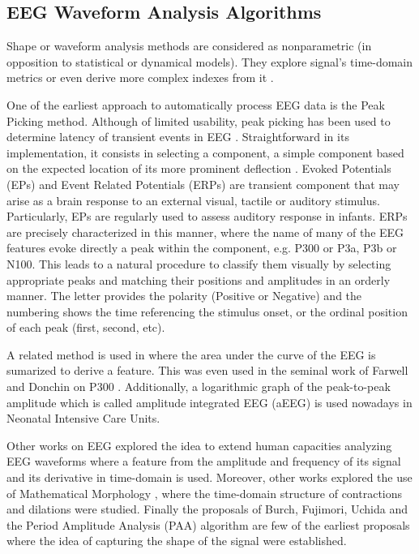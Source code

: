 
\subsection{EEG Waveform Analysis Algorithms}
\label{waveformalgorithms}

Shape or waveform analysis methods are considered as nonparametric (in opposition to statistical or dynamical models).  They explore signal's time-domain metrics or even derive more complex indexes from it \cite{Thakor2009}. 

One of the earliest approach to automatically process EEG data is the Peak Picking method.  Although of limited usability, peak picking has been used to determine latency of transient events in EEG \cite{Jaskowski2000,Zhang2011}.  Straightforward in its implementation, it consists in selecting a component, a simple component based on the expected location of its more prominent deflection \cite{Ouyang2017}.  Evoked Potentials (EPs) and Event Related Potentials (ERPs) are transient component that may arise as a brain response to an external visual, tactile or auditory stimulus.  Particularly, EPs are regularly used to assess auditory response in infants. ERPs are precisely characterized in this manner, where the name of many of the EEG features evoke directly a peak within the component, e.g. P300 or P3a, P3b or N100.  This leads to a natural procedure to classify them visually by selecting appropriate peaks and matching their positions and amplitudes in an orderly manner.  The letter provides the polarity (Positive or Negative) and the numbering shows the time referencing the stimulus onset, or the ordinal position of each peak (first, second, etc).   

A related method is used in \cite{Alvarado-Gonzalez2016} where the area under the curve of the EEG is sumarized to derive a feature.  This was even used in the seminal work of Farwell and Donchin on P300 \cite{Farwell1988,WolpawJonathanR2012}. Additionally, a logarithmic graph of the peak-to-peak amplitude which is called amplitude integrated EEG (aEEG) \cite{Shah2015} is used nowadays in Neonatal Intensive Care Units.

Other works on EEG explored the idea to extend human capacities analyzing EEG waveforms \cite{Klein1976} where a feature from the amplitude and frequency of its signal and its derivative in time-domain is used.  Moreover, other works explored the use of Mathematical Morphology \cite{Yamaguchi2009}, where the time-domain structure of contractions and dilations were studied. Finally the proposals of Burch, Fujimori, Uchida and the Period Amplitude Analysis (PAA) \cite{Uchida1996} algorithm are few of the earliest proposals where the idea of capturing the shape of the signal were established.

